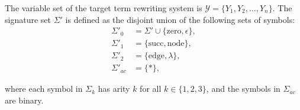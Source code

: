 \begin{definition}
    The variable set of the target term rewriting system is \(\mathcal{Y} = \{ Y_1, Y_2, \ldots, Y_n \}\). The signature set $\Sigma'$ is defined as the disjoint union of the following sets of symbols:
    \begin{align*}
        \Sigma'_0 &= \Sigma' \cup \{ \text{zero}, \epsilon \}, \\ 
        \Sigma'_1 &= \{\text{succ}, \text{node}\}, \\
        \Sigma'_2 &= \{ \text{edge}, \lambda\}, \\
        \Sigma'_{ac} &= \{ * \},
    \end{align*}
    
    where each symbol in \(\Sigma_k\) has arity \(k\) for all \(k \in \{1,2,3\}\), and the symbols in \(\Sigma_{ac}\) are binary.
    \end{definition}
